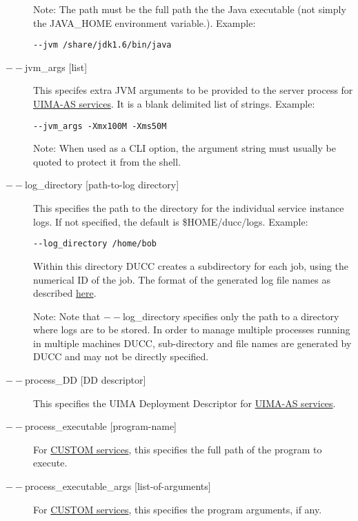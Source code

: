 \begin{description}
          Note: The path must be the full path the the Java executable (not 
          simply the JAVA\_HOME environment variable.).  Example:
\begin{verbatim}
--jvm /share/jdk1.6/bin/java 
\end{verbatim}


        \item[$--$jvm\_args {[list]} ]        
          This specifes extra JVM arguments to be provided to the server process for
          \hyperref[sec:services.types]{UIMA-AS services}. It is a blank delimited 
            list of strings. Example: 
\begin{verbatim}
--jvm_args -Xmx100M -Xms50M
\end{verbatim}

          Note: When used as a CLI option, the argument string must usually be quoted to protect
          it from the shell.
    
          \item[$--$log\_directory {[path-to-log directory]}] This specifies the path to the directory for
            the individual service instance logs. If not specified, the default is \$HOME/ducc/logs. Example:
\begin{verbatim}
--log_directory /home/bob 
\end{verbatim}
        
        Within this directory DUCC creates a subdirectory for each job, using the numerical 
        ID of the job. The format of the generated log file names as described
        \hyperref[chap:job-logs]{here}.
        
        Note: Note that $--$log\_directory specifies only the path to a directory where 
        logs are to be stored. In order to manage multiple processes running in multiple 
        machines DUCC, sub-directory and file names are generated by DUCC and may 
        not be directly specified. 

      \item[$--$process\_DD {[DD descriptor]}] 
        This specifies the UIMA Deployment Descriptor for \hyperref[sec:services.types]{UIMA-AS services}.

      \item[$--$process\_executable {[program-name]}] For \hyperref[sec:services.types]{CUSTOM
          services}, this specifies the full path of the program to execute.

      \item[$--$process\_executable\_args {[list-of-arguments]}] For \hyperref[sec:services.types]{CUSTOM
          services}, this specifies the program arguments, if any.


\end{description}

